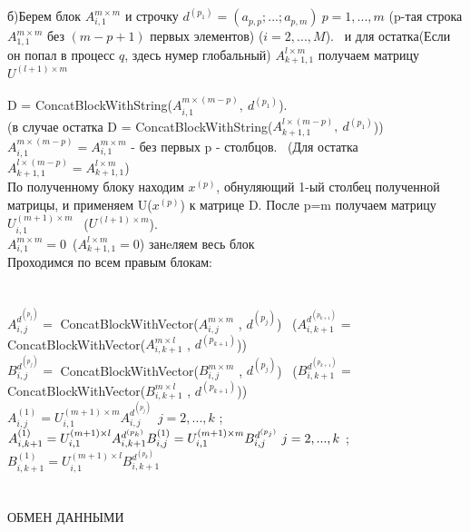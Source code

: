 \documentclass[a4paper,12pt]{article}
\begin{document}
\hspace{0.25cm} б)Берем блок $A_{i,1}^{{m\times m}}$ и строчку $d^{(p_{1})} = (a_{p,p};...;a_{p,m}) \ p = 1,...,m$  (p-тая строка $A_{1,1}^{m\times m} $ без $(m-p+1)$ первых элементов) ($i = 2,...,M$). \ и для остатка(Если он попал в процесс $q$, здесь нумер глобальный) $A_{k+1,1}^{{l\times m}}$ получаем матрицу $U^{(l+1)\times m}$\\\\
D = ConcatBlockWithString($A_{i,1}^{{m\times (m-p)}}, \ d^{(p_{1})}$).\\ 
(в случае остатка D = ConcatBlockWithString($A_{k+1,1}^{{l\times (m-p)}}, \ d^{(p_{1})}$))\\
$A_{i,1}^{m\times (m-p)} = A_{i,1}^{m\times m}$ - без первых p - столбцов. \ (Для остатка $A_{k+1,1}^{l\times (m-p)} = A_{k+1,1}^{l\times m}$)\\
 По полученному блоку находим $x^{(p)}$, обнуляющий 1-ый столбец полученной матрицы, и применяем U($x^{(p)}$) к матрице D. После p=m получаем матрицу $U_{i,1}^{(m+1)\times m}$ \ ($U^{(l+1)\times m}$).\\
$A_{i,1}^{{m\times m}} = 0$\  ($A_{k+1,1}^{{l\times m}} = 0$) занeляем весь блок \\
Проходимся по всем правым блокам:\\
\\\\$A_{i,j}^{d^{(p_{j})}} =$  ConcatBlockWithVector($A_{i,j}^{m\times m}$ , $d^{(p_{j})}$) \ ($A_{i,k+1}^{d^{(p_{k+1})}} = $   ConcatBlockWithVector($A_{i,k+1}^{m\times l}$ , $d^{(p_{k+1})}$)) \\

$B_{i,j}^{d^{(p_{j})}} = $ ConcatBlockWithVector($B_{i,j}^{m\times m}$ , $d^{(p_{j})}$) \ 
($B_{i,k+1}^{d^{(p_{k+1})}} = $   ConcatBlockWithVector($B_{i,k+1}^{m\times l}$ , $d^{(p_{k+1})}$))\\

$A_{i,j}^{(1)} = U_{i,1}^{(m+1)\times m} A_{i,j}^{d^{(p_{j})}} \ \ j = 2,...,k$ ;  $A_{i,k+1}^{(1)} = U_{i,1}^{(m+1)\times l} A_{i, k+1}^{d^{(p_{k})}} \\ B_{i,j}^{(1)} = U_{i,1}^{(m+1)\times m} B_{i,j}^{d^{(p_{j})}} \  j = 2,...,k$ ;  $B_{i,k+1}^{(1)} = U_{i,1}^{(m+1)\times l} B_{i, k+1}^{d^{(p_{k})}} $\\\\\\

{\fontsize{10}{10}\selectfont ОБМЕН ДАННЫМИ}\\
\end{document}
